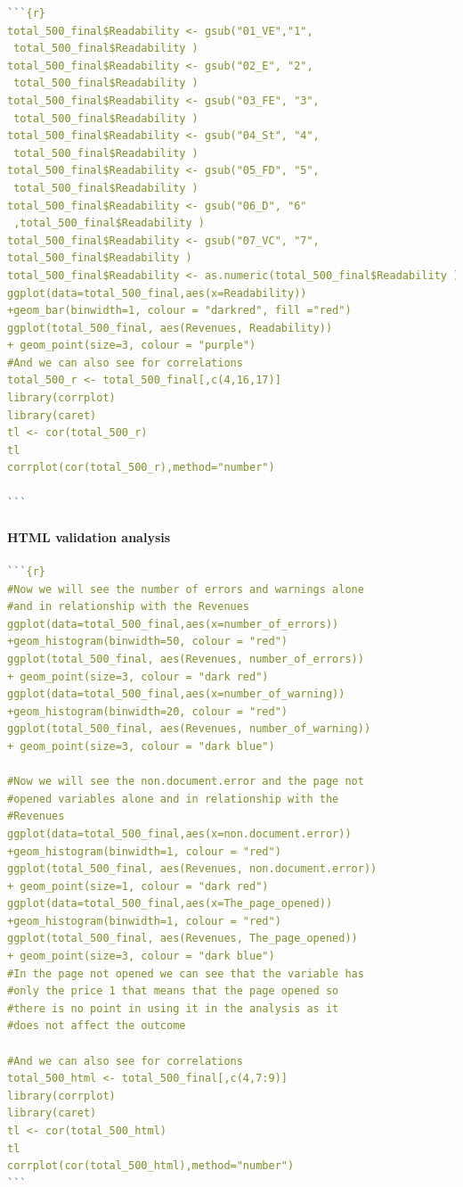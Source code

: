 \documentclass{article}
\begin{document}
\begin{lstlisting}[language=R]
```{r}
total_500_final$Readability <- gsub("01_VE","1",
 total_500_final$Readability )
total_500_final$Readability <- gsub("02_E", "2",
 total_500_final$Readability )
total_500_final$Readability <- gsub("03_FE", "3",
 total_500_final$Readability )
total_500_final$Readability <- gsub("04_St", "4",
 total_500_final$Readability )
total_500_final$Readability <- gsub("05_FD", "5",
 total_500_final$Readability )
total_500_final$Readability <- gsub("06_D", "6"
 ,total_500_final$Readability )
total_500_final$Readability <- gsub("07_VC", "7",
total_500_final$Readability )
total_500_final$Readability <- as.numeric(total_500_final$Readability )
ggplot(data=total_500_final,aes(x=Readability))
+geom_bar(binwidth=1, colour = "darkred", fill ="red")
ggplot(total_500_final, aes(Revenues, Readability)) 
+ geom_point(size=3, colour = "purple")
#And we can also see for correlations
total_500_r <- total_500_final[,c(4,16,17)]
library(corrplot)
library(caret)
tl <- cor(total_500_r)
tl
corrplot(cor(total_500_r),method="number")

```
 \end{lstlisting} 


\paragraph{HTML validation analysis}\label{r: van: html}
\begin{lstlisting}[language=R]  
```{r}
#Now we will see the number of errors and warnings alone 
#and in relationship with the Revenues
ggplot(data=total_500_final,aes(x=number_of_errors))
+geom_histogram(binwidth=50, colour = "red")
ggplot(total_500_final, aes(Revenues, number_of_errors)) 
+ geom_point(size=3, colour = "dark red")
ggplot(data=total_500_final,aes(x=number_of_warning))
+geom_histogram(binwidth=20, colour = "red")
ggplot(total_500_final, aes(Revenues, number_of_warning)) 
+ geom_point(size=3, colour = "dark blue")

#Now we will see the non.document.error and the page not 
#opened variables alone and in relationship with the 
#Revenues
ggplot(data=total_500_final,aes(x=non.document.error))
+geom_histogram(binwidth=1, colour = "red")
ggplot(total_500_final, aes(Revenues, non.document.error)) 
+ geom_point(size=1, colour = "dark red")
ggplot(data=total_500_final,aes(x=The_page_opened))
+geom_histogram(binwidth=1, colour = "red")
ggplot(total_500_final, aes(Revenues, The_page_opened)) 
+ geom_point(size=3, colour = "dark blue")
#In the page not opened we can see that the variable has 
#only the price 1 that means that the page opened so 
#there is no point in using it in the analysis as it 
#does not affect the outcome

#And we can also see for correlations
total_500_html <- total_500_final[,c(4,7:9)]
library(corrplot)
library(caret)
tl <- cor(total_500_html)
tl
corrplot(cor(total_500_html),method="number")
```
\end{lstlisting} 
\end{document}

